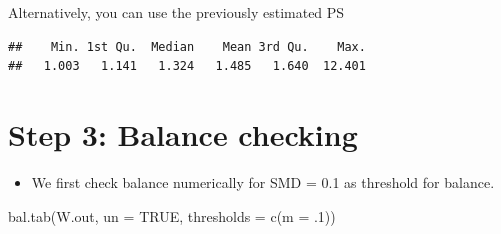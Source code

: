 \documentclass[
]{book}
\newenvironment{Shaded}{\begin{snugshade}}{\end{snugshade}}
\newcommand{\AttributeTok}[1]{\textcolor[rgb]{0.77,0.63,0.00}{#1}}
\newcommand{\ConstantTok}[1]{\textcolor[rgb]{0.00,0.00,0.00}{#1}}
\newcommand{\DecValTok}[1]{\textcolor[rgb]{0.00,0.00,0.81}{#1}}
\newcommand{\FunctionTok}[1]{\textcolor[rgb]{0.00,0.00,0.00}{#1}}
\newcommand{\NormalTok}[1]{#1}
\newcommand{\OtherTok}[1]{\textcolor[rgb]{0.56,0.35,0.01}{#1}}
\newcommand{\SpecialCharTok}[1]{\textcolor[rgb]{0.00,0.00,0.00}{#1}}
\newcommand{\StringTok}[1]{\textcolor[rgb]{0.31,0.60,0.02}{#1}}
\providecommand{\tightlist}{%
  \setlength{\itemsep}{0pt}\setlength{\parskip}{0pt}}
\begin{document}
Alternatively, you can use the previously estimated PS

\begin{Shaded}
\end{Shaded}

\begin{verbatim}
##    Min. 1st Qu.  Median    Mean 3rd Qu.    Max. 
##   1.003   1.141   1.324   1.485   1.640  12.401
\end{verbatim}

\hypertarget{step-3-balance-checking-1}{%
\section{Step 3: Balance checking}\label{step-3-balance-checking-1}}

\begin{itemize}
\tightlist
\item
  We first check balance numerically for SMD = 0.1 as threshold for balance.
\end{itemize}

\begin{Shaded}
\begin{Highlighting}[]
\FunctionTok{bal.tab}\NormalTok{(W.out, }\AttributeTok{un =} \ConstantTok{TRUE}\NormalTok{, }
        \AttributeTok{thresholds =} \FunctionTok{c}\NormalTok{(}\AttributeTok{m =}\NormalTok{ .}\DecValTok{1}\NormalTok{))}
\end{Highlighting}
\end{Shaded}
\end{document}
